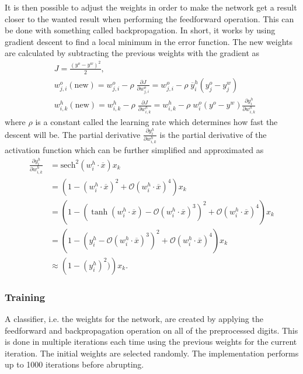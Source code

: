 \documentclass[report.tex]{subfile}
\begin{document}
It is then possible to adjust the weights in order to make the network get a
result closer to the wanted result when performing the feedforward operation.
This can be done with something called backpropagation. In short, it works by
using gradient descent to find a local minimum in the error function. The new
weights are calculated by subtracting the previous weights with the gradient as
\begin{align*}
    &J = \frac{(y^o - y^w)^2}{2}, \\
    &w^o_{j,i}(\textrm{new}) = w^o_{j,i}
            - \rho \; \frac{\partial J}{\partial w^o_{j,i}}
        = w^o_{j,i} - \rho \; \overline y^h_i (y^o_j - y^w_j)\\
    &w^h_{i,k}(\textrm{new}) = w^h_{i,k}
            - \rho \; \frac{\partial J}{\partial w^h_{i,k}}
        = w^h_{i,k} - \rho \; w^o_i(y^o - y^w)
            \frac{\partial y^h_i}{\partial w^h_{i,k}}
\end{align*}
where $\rho$ is a constant called the learning rate which determines how fast
the descent will be. The partial derivative $\frac{\partial y^h_i}{\partial
w^h_{i,k}}$ is the partial derivative of the activation function which can be
further simplified and approximated as
\begin{align*}
    \frac{\partial y^h_i}{\partial w^h_{i,k}}
        &= \textrm{sech}^2\left( w^h_i \cdot \overline x \right) x_k \\
        &= \left(1-\left( w^h_i \cdot \overline x \right)^2
            + \mathcal{O}\left( w^h_i \cdot \overline x \right)^4
           \right) x_k\\
        &= \left(1-\left(\tanh\left( w^h_i \cdot \overline x\right)
            - \mathcal{O}\left(w^h_i \cdot \overline x \right)^3 \right)^2
                + \mathcal{O}\left( w^h_i \cdot \overline x \right)^4
           \right) x_k\\
        &= \left(1-\left(
                    y^h_i - \mathcal{O}\left(w^h_i \cdot \overline x \right)^3
                   \right)^2
                + \mathcal{O}\left( w^h_i \cdot \overline x \right)^4
           \right) x_k\\
        &\approx \left(1-(y^h_i)^2)\right) x_k.
\end{align*}

\subsubsection{Training}
A classifier, i.e. the weights for the network, are created by applying the
feedforward and backpropagation operation on all of the preprocessed digits.
This is done in multiple iterations each time using the previous weights for
the current iteration. The initial weights are selected randomly. The
implementation performs up to 1000 iterations before abrupting.
\end{document}
